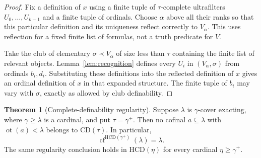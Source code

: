 \documentclass[11pt,letterpaper]{article}
\theoremstyle{definition}
\newtheorem{theorem}[definition]{Theorem}
\newcommand{\cf}{\operatorname{cf}}
\newcommand{\ot}{\operatorname{ot}}
\newcommand{\CD}{\mathrm{CD}}
\newcommand{\HCD}{\mathrm{HCD}}
\begin{document}
\begin{proof}
Fix a definition of $x$ using a finite tuple of $\tau$-complete ultrafilters $U_0,\ldots,U_{k-1}$ and a finite tuple of ordinals. Choose $\alpha$ above all their ranks so that this particular definition and its uniqueness reflect correctly to $V_\alpha$. This uses reflection for a fixed finite list of formulas, not a truth predicate for $V$.

Take the club of elementary $\sigma\prec V_\alpha$ of size less than $\tau$ containing the finite list of relevant objects. Lemma~\ref{lem:recognition} defines every $U_i$ in $(V_\alpha,\sigma)$ from ordinals $b_i,d_i$. Substituting these definitions into the reflected definition of $x$ gives an ordinal definition of $x$ in that expanded structure. The finite tuple of $b_i$ may vary with $\sigma$, exactly as allowed by club definability.
\end{proof}

\begin{theorem}[Complete-definability regularity]\label{thm:CD-regular}
Suppose $\lambda$ is $\gamma$-cover exacting, where $\gamma\geq\lambda$ is a cardinal, and put $\tau=\gamma^+$. Then no cofinal $a\subseteq\lambda$ with $\ot(a)<\lambda$ belongs to $\CD(\tau)$. In particular,
\begin{equation}\label{eq:HCDreg}
 \cf^{\HCD(\gamma^+)}(\lambda)=\lambda.
\end{equation}
The same regularity conclusion holds in $\HCD(\eta)$ for every cardinal $\eta\geq\gamma^+$.
\end{theorem}
\end{document}
